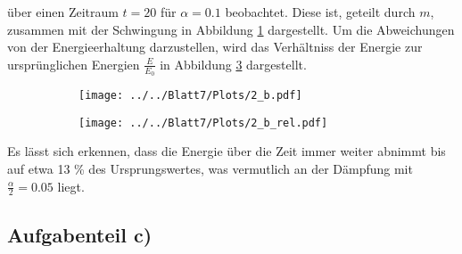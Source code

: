 über einen Zeitraum $t = 20$ für $\alpha = 0.1$ beobachtet. Diese ist, geteilt durch $m$, zusammen mit der Schwingung in Abbildung \ref{fig:2_E} dargestellt. Um die Abweichungen von der Energieerhaltung darzustellen, wird das Verhältniss der Energie zur ursprünglichen Energien $\frac{E}{E_0}$ in Abbildung \ref{fig:2_E_rel} dargestellt.
\begin{figure}[H]
\begin{subfigure}[c]{0.5\textwidth}
\texttt{[image: ../../Blatt7/Plots/2\_b.pdf]}
\label{fig:2_E}
\end{subfigure}
\begin{subfigure}[c]{0.5\textwidth}
\texttt{[image: ../../Blatt7/Plots/2\_b\_rel.pdf]}
\label{fig:2_E_rel}
\end{subfigure}
\end{figure}
Es lässt sich erkennen, dass die Energie über die Zeit immer weiter abnimmt bis auf etwa 13 \% des Ursprungswertes, was vermutlich an der Dämpfung mit $\frac{\alpha}{2}=0.05$ liegt.

\subsection*{Aufgabenteil c)}

